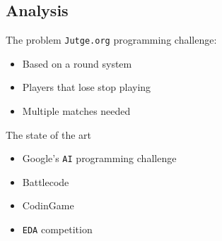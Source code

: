 \documentclass{beamer}
\begin{document}
\subsection{Analysis}
\begin{frame}{The problem}
\texttt{Jutge.org} programming challenge:
\begin{itemize}
\item
Based on a round system
\item
Players that lose stop playing
\item
Multiple matches needed
\end{itemize}
\end{frame}
\begin{frame}{The state of the art}
\begin{itemize}
\item
Google's \texttt{AI} programming challenge \cite{google_ai}
\item
Battlecode \cite{battlecode}
\item
CodinGame \cite{codingame}
\item
\texttt{EDA} competition \cite{eda}
\end{itemize}
\end{frame}
\end{document}
